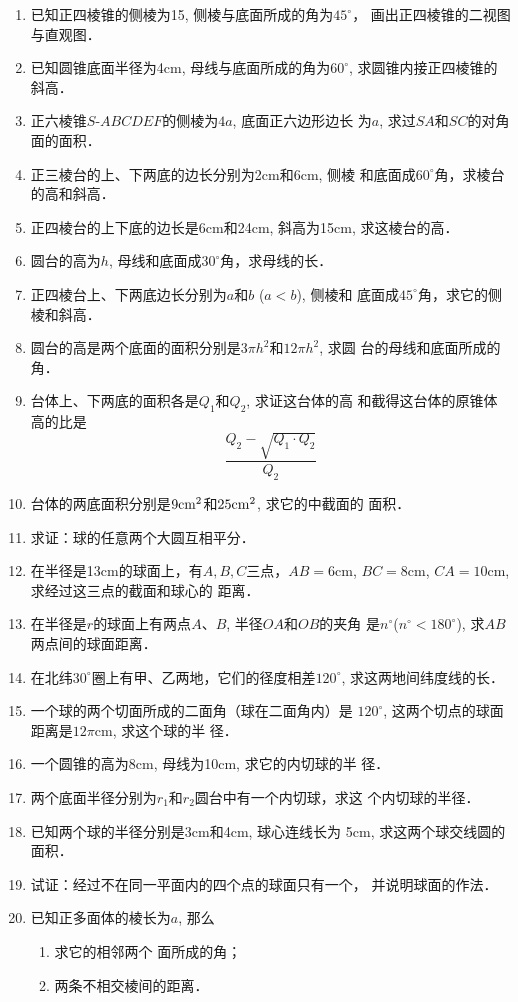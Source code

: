 \begin{enumerate}
\item 已知正四棱锥的侧棱为15, 侧棱与底面所成的角为$45^{\circ}$，
画出正四棱锥的二视图与直观图．
\item 已知圆锥底面半径为4cm, 母线与底面所成的角为$60^{\circ}$,
求圆锥内接正四棱锥的斜高．
\item 正六棱锥$S$-$ABCDEF$的侧棱为$4a$, 底面正六边形边长
为$a$, 求过$SA$和$SC$的对角面的面积．
\item 正三棱台的上、下两底的边长分别为2cm和6cm, 侧棱
和底面成$60^{\circ}$角，求棱台的高和斜高．
\item 正四棱台的上下底的边长是6cm和24cm, 斜高为15cm, 
求这棱台的高．
\item 圆台的高为$h$, 母线和底面成$30^{\circ}$角，求母线的长．
\item 正四棱台上、下两底边长分别为$a$和$b$ ($a<b$), 侧棱和
底面成$45^{\circ}$角，求它的侧棱和斜高．
\item 圆台的高是两个底面的面积分别是$3\pi h^2$和$12\pi h^2$, 求圆
台的母线和底面所成的角．
\item 台体上、下两底的面积各是$Q_1$和$Q_2$, 求证这台体的高
和截得这台体的原锥体高的比是
\[\frac{Q_2-\sqrt{Q_1\cdot Q_2}}{Q_2}\]
\item 台体的两底面积分别是$9{\rm cm^2}$和$25{\rm cm^2}$, 求它的中截面的
面积．
\item 求证：球的任意两个大圆互相平分．
\item 在半径是13cm的球面上，有$A,B,C$三点，$AB=6$cm, 
$BC=8$cm, $CA=10$cm, 求经过这三点的截面和球心的
距离．
\item 在半径是$r$的球面上有两点$A$、$B$, 半径$OA$和$OB$的夹角
是$n^{\circ}$($n^{\circ}<180^{\circ}$), 求$AB$两点间的球面距离．
\item 在北纬$30^{\circ}$圈上有甲、乙两地，它们的径度相差$120^{\circ}$,
求这两地间纬度线的长．
\item 一个球的两个切面所成的二面角（球在二面角内）是
$120^{\circ}$, 这两个切点的球面距离是$12\pi$cm, 求这个球的半
径．
\item 一个圆锥的高为8cm, 母线为10cm, 求它的内切球的半
径．
\item 两个底面半径分别为$r_1$和$r_2$圆台中有一个内切球，求这
个内切球的半径．
\item 已知两个球的半径分别是3cm和4cm, 球心连线长为
5cm, 求这两个球交线圆的面积．
\item 试证：经过不在同一平面内的四个点的球面只有一个，
并说明球面的作法．
\item 已知正多面体的棱长为$a$, 那么
\begin{enumerate}
\item 求它的相邻两个
面所成的角；
\item 两条不相交棱间的距离．
\end{enumerate}


\end{enumerate}
